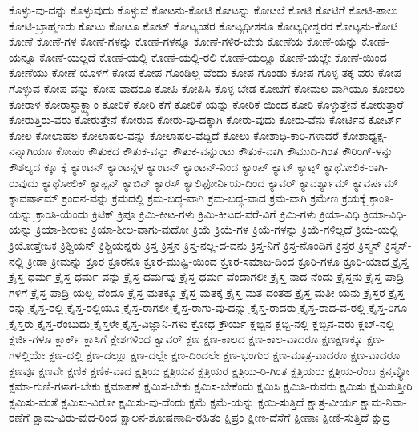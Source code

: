 {ಕೊಳ್ಳು-ವು-ದನ್ನು
ಕೊಳ್ಳುವುದು
ಕೊಳ್ಳುವೆ
ಕೋಟನು-ಕೋಟಿ
ಕೋಟನ್ನು
ಕೋಟಲೆ
ಕೋಟಿ
ಕೋಟಿಗೆ
ಕೋಟಿ-ಪಾಲು
ಕೋಟಿ-ಬ್ರಾಹ್ಮಣರು
ಕೋಟು
ಕೋಟೂ
ಕೋಟ್
ಕೋಟ್ಯಂತರ
ಕೋಟ್ಯಧೀಶನೂ
ಕೋಟ್ಯಧೀಶ್ವರರ
ಕೋಟ್ಯನು-ಕೋಟಿ
ಕೋಣೆ
ಕೋಣೆ-ಗಳ
ಕೋಣೆ-ಗಳನ್ನು
ಕೋಣೆ-ಗಳನ್ನೂ
ಕೋಣೆ-ಗಳಿರ-ಬೇಕು
ಕೋಣೆಯ
ಕೋಣೆ-ಯನ್ನು
ಕೋಣೆ-ಯನ್ನೂ
ಕೋಣೆ-ಯಲ್ಲದೆ
ಕೋಣೆ-ಯಲ್ಲಿ
ಕೋಣೆ-ಯಲ್ಲಿ-ರಲಿ
ಕೋಣೆ-ಯಲ್ಲೂ
ಕೋಣೆ-ಯಲ್ಲೇ
ಕೋಣೆ-ಯಿಂದ
ಕೋಣೆಯು
ಕೋಣೆ-ಯೊಳಗೆ
ಕೋಪ
ಕೋಪ-ಗೊಂಡಿಲ್ಲ-ವೆಂದು
ಕೋಪ-ಗೊಂಡು
ಕೋಪ-ಗೊಳ್ಳ-ತಕ್ಕ-ವರು
ಕೋಪ-ಗೊಳ್ಳುವ
ಕೋಪ-ವನ್ನು
ಕೋಪ-ವಾದರೂ
ಕೋಪಿ
ಕೋಪಿಸಿ-ಕೊಳ್ಳ-ಬೇಡ
ಕೋಬೆಗೆ
ಕೋಮಲ-ವಾಗಿಯೂ
ಕೋರಲು
ಕೋರಾಳ
ಕೋರಾಸ್ಟಾಕ್ಹ್ಯಾಂ
ಕೋರಿಕೆ
ಕೋರಿ-ಕೆಗೆ
ಕೋರಿಕೆ-ಯನ್ನು
ಕೋರಿಕೆ-ಯಿಂದ
ಕೋರಿ-ಕೊಳ್ಳುತ್ತೇನೆ
ಕೋರುತ್ತಾರೆ
ಕೋರುತ್ತಿರು-ವರು
ಕೋರುತ್ತೇನೆ
ಕೋರುವ
ಕೋರು-ವು-ದಕ್ಕಾಗಿ
ಕೋರು-ವುದು
ಕೋರು-ವೆನು
ಕೋರ್ಟಿನ
ಕೋರ್ಟ್
ಕೋಲ
ಕೋಲಾಹಲ
ಕೋಲಾಹಲ-ವನ್ನು
ಕೋಲಾಹಲ-ವೆದ್ದಿದೆ
ಕೋಲು
ಕೋಶಾಧಿ-ಕಾರಿ-ಗಳಾದರೆ
ಕೋಶಾಧ್ಯಕ್ಷ-ನನ್ನಾಗಿಯೂ
ಕೋಹಂ
ಕೌತುಕದ
ಕೌತುಕ-ವನ್ನು
ಕೌತುಕ-ವನ್ನುಂಟು
ಕೌತುಕ-ವಾಗಿ
ಕೌಮುದಿ-ಗಿಂತ
ಕೌರಿಂಗ್-ಳನ್ನು
ಕೌಶಲ್ಯದ
ಕ್ಕೂ
ಕ್ಕೆ
ಕ್ಯಾಂಟನ್
ಕ್ಯಾಂಟನ್ಗಳ
ಕ್ಯಾಂಟನ್
ಕ್ಯಾಂಟನ್-ನಿಂದ
ಕ್ಯಾಂಪ್
ಕ್ಯಾಟ್
ಕ್ಯಾಟ್ಸ್
ಕ್ಯಾಥೋಲಿಕ-ರಾಗಿ-ರುವುದು
ಕ್ಯಾಥೋಲಿಕ್
ಕ್ಯಾಪ್ಟನ್
ಕ್ಯಾಬಿನ್
ಕ್ಯಾರಸ್
ಕ್ಯಾಲಿಫೋರ್ನಿಯ-ದಿಂದ
ಕ್ಯಾವರ್
ಕ್ಯಾವರ್ಶ್ಯಾಮ್
ಕ್ಯಾವರ್ಷಮ್
ಕ್ಯಾವರ್ಷಾಮ್
ಕ್ರಂದನ-ವನ್ನು
ಕ್ರಮದಲ್ಲಿ
ಕ್ರಮ-ಬದ್ಧ-ವಾಗಿ
ಕ್ರಮ-ಬದ್ಧ-ವಾದ
ಕ್ರಮ-ವಾಗಿ
ಕ್ರಮೇಣ
ಕ್ರಯಕ್ಕೆ
ಕ್ರಾಂತಿ-ಯನ್ನು
ಕ್ರಾಂತಿ-ಯೆಂದು
ಕ್ರಿಟಿಕ್
ಕ್ರಿಪೂ
ಕ್ರಿಮಿ-ಕೀಟ-ಗಳು
ಕ್ರಿಮಿ-ಕೀಟದ-ವರೆ-ವಿಗೆ
ಕ್ರಿಮಿ-ಗಳು
ಕ್ರಿಯಾ-ವಿಧಿ
ಕ್ರಿಯಾ-ವಿಧಿ-ಯನ್ನು
ಕ್ರಿಯಾ-ಶೀಲಳು
ಕ್ರಿಯಾ-ಶೀಲ-ವಾಗು-ವುದೋ
ಕ್ರಿಯೆ
ಕ್ರಿಯೆ-ಗಳ
ಕ್ರಿಯೆ-ಗಳನ್ನು
ಕ್ರಿಯೆ-ಗಳಿಲ್ಲದೆ
ಕ್ರಿಯೆ-ಯಲ್ಲಿ
ಕ್ರಿಯೋತ್ತೇಜಕ
ಕ್ರಿಶ್ಚಿಯನ್
ಕ್ರಿಶ್ಚಿಯನ್ನರು
ಕ್ರಿಸ್ತ
ಕ್ರಿಸ್ತನ
ಕ್ರಿಸ್ತ-ನಲ್ಲ-ದ-ವನು
ಕ್ರಿಸ್ತ-ನಿಗೆ
ಕ್ರಿಸ್ತ-ನೊಂದಿಗೆ
ಕ್ರಿಸ್ತರ
ಕ್ರಿಸ್ಮಸ್
ಕ್ರಿಸ್ಮಸ್-ನಲ್ಲಿ
ಕ್ರೀಡಾ
ಕ್ರೀಮನ್ನು
ಕ್ರೂರ
ಕ್ರೂರನೂ
ಕ್ರೂರ-ಮುಷ್ಟಿ-ಯಿಂದ
ಕ್ರೂರ-ಸಮಾಜ-ದಿಂದ
ಕ್ರೂರಿ-ಗಳೂ
ಕ್ರೂರಿ-ಯಾದ
ಕ್ರೈಸ್ತ
ಕ್ರೈಸ್ತ-ಧರ್ಮ
ಕ್ರೈಸ್ತ-ಧರ್ಮ-ವನ್ನು
ಕ್ರೈಸ್ತ-ಧರ್ಮವು
ಕ್ರೈಸ್ತ-ಧರ್ಮ-ವೆಂದಾಗಲೀ
ಕ್ರೈಸ್ತ-ನಾದ-ನೆಂದು
ಕ್ರೈಸ್ತನು
ಕ್ರೈಸ್ತ-ಪಾದ್ರಿ-ಗಳಿಗೆ
ಕ್ರೈಸ್ತ-ಪಾದ್ರಿ-ಯಲ್ಲ-ವೆಂದೂ
ಕ್ರೈಸ್ತ-ಮತಕ್ಕೂ
ಕ್ರೈಸ್ತ-ಮತಕ್ಕೆ
ಕ್ರೈಸ್ತ-ಮತ-ದಂತಹ
ಕ್ರೈಸ್ತ-ಮತೀ-ಯನು
ಕ್ರೈಸ್ತರ
ಕ್ರೈಸ್ತ-ರನ್ನು
ಕ್ರೈಸ್ತ-ರಲ್ಲಿ
ಕ್ರೈಸ್ತ-ರಲ್ಲಿಯೂ
ಕ್ರೈಸ್ತ-ರಾಗಲೀ
ಕ್ರೈಸ್ತ-ರಾಗು-ವು-ದನ್ನು
ಕ್ರೈಸ್ತ-ರಾದರು
ಕ್ರೈಸ್ತ-ರಾದ-ವ-ರಲ್ಲಿ
ಕ್ರೈಸ್ತ-ರಿಗೂ
ಕ್ರೈಸ್ತರು
ಕ್ರೈಸ್ತ-ರೆಂಬುದು
ಕ್ರೈಸ್ತಳೇ
ಕ್ರೈಸ್ತ-ವಿಜ್ಞಾನಿ-ಗಳು
ಕ್ರೋಧ
ಕ್ರೌರ್ಯ
ಕ್ಲಬ್ಬಿನ
ಕ್ಲಬ್ಬಿ-ನಲ್ಲಿ
ಕ್ಲಬ್ಬಿನ-ವರು
ಕ್ಲಬ್-ನಲ್ಲಿ
ಕ್ಲರ್ಜಿ-ಗಳೂ
ಕ್ಲಾರ್ಕ್
ಕ್ಲಾಸಿಗೆ
ಕ್ಲೇಶಗಳಿಂದ
ಕ್ವಾವರ್
ಕ್ಷಣ
ಕ್ಷಣ-ಕಾಲದ
ಕ್ಷಣ-ಕಾಲ-ವಾದರೂ
ಕ್ಷಣಕ್ಷಣಕ್ಕೂ
ಕ್ಷಣ-ಗಳಲ್ಲಿಯೇ
ಕ್ಷಣ-ದಲ್ಲಿ
ಕ್ಷಣ-ದಲ್ಲೂ
ಕ್ಷಣ-ದಲ್ಲೇ
ಕ್ಷಣ-ದಿಂದಲೇ
ಕ್ಷಣ-ಭಂಗುರ
ಕ್ಷಣ-ಮಾತ್ರ-ವಾದರೂ
ಕ್ಷಣ-ವಾದರೂ
ಕ್ಷಣವೂ
ಕ್ಷಣವೇ
ಕ್ಷಣಿಕ
ಕ್ಷಣಿಕ-ವಾದ
ಕ್ಷತ್ರಿಯ
ಕ್ಷತ್ರಿಯನ
ಕ್ಷತ್ರಿಯರ
ಕ್ಷತ್ರಿಯ-ರಿ-ಗಿಂತ
ಕ್ಷತ್ರಿಯರು
ಕ್ಷತ್ರಿಯ-ರೆಂಬ
ಕ್ಷನ್ತವ್ಯೋ
ಕ್ಷಮಾ-ಗುಣಿ-ಗಳಾಗ-ಬೇಕು
ಕ್ಷಮಾಪಣೆ
ಕ್ಷಮಿಸ-ಬೇಕು
ಕ್ಷಮಿಸ-ಬೇಕೆಂದು
ಕ್ಷಮಿಸಿ
ಕ್ಷಮಿಸಿ-ರುವರು
ಕ್ಷಮಿಸು
ಕ್ಷಮಿಸುತ್ತೀರಿ
ಕ್ಷಮಿಸು-ವಂತೆ
ಕ್ಷಮಿಸು-ವಿರೋ
ಕ್ಷಮಿಸು-ವು-ದೆಂದು
ಕ್ಷಮೆ
ಕ್ಷಮೆ-ಯನ್ನು
ಕ್ಷಯಿ-ಸುತ್ತಿದೆ
ಕ್ಷಾತ್ರ-ವೀರ್ಯ
ಕ್ಷಾಮ-ನಿವಾ-ರಣೆಗೆ
ಕ್ಷಾಮ-ವಿರು-ವುದ-ರಿಂದ
ಕ್ಷಾಲನ-ಶೋಷಣಾದಿ-ರಹಿತಂ
ಕ್ಷಿಪ್ರಂ
ಕ್ಷೀಣ-ದೆಸೆಗೆ
ಕ್ಷೀಣಾಃ
ಕ್ಷೀಣಿ-ಸುತ್ತಿದೆ
ಕ್ಷುದ್ರ
}
